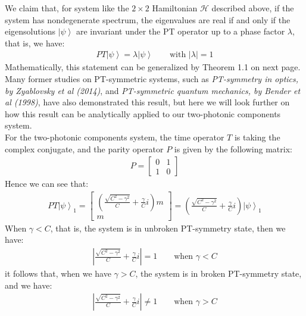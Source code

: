 \documentclass[1pt]{book}
\theoremstyle{break}
\theoremstyle{break}
\newcommand{\bmat}[1]{\begin{bmatrix} #1 \end{bmatrix}}
\begin{document}
We claim that, for system like the $2\times 2$ Hamiltonian 
$\mathcal{H}$ described above, if the system has nondegenerate spectrum,  the eigenvalues are real if and only if the eigensolutions $ \left|\psi\right>$ are invariant under the PT operator up to a phase factor $\lambda$, that is, we have:
\begin{align*}
PT \left|\psi\right> = \lambda \left|\psi\right> \qquad \text{with }|\lambda | =1  \tag{in unbroken PT-symmetric phase}
\end{align*}
Mathematically, this statement can be generalized by Theorem 1.1 on next page. Many former studies on PT-symmetric systems, such as \textit{PT-symmetry in optics, by Zyablovsky et al (2014)}, and \textit{PT-symmetric quantum mechanics, by Bender et al (1998)}, have also demonstrated this result, but here we will look further on how this result can be analytically applied to our two-photonic components system.\\

For the two-photonic components system, the time operator $T$ is taking the complex conjugate, and the parity operator $P$ is given by the following matrix:
\begin{align*}
P = \bmat{0 & 1 \\ 1 & 0}
\end{align*}
Hence we can see that:
\begin{align*}
PT \left|\psi\right>_1 = \bmat{\left(\frac{\sqrt{C^2 - \gamma^2}}{C}+\frac{\gamma}{C}i\right)m \\ m} = \left(\frac{\sqrt{C^2 - \gamma^2}}{C}+\frac{\gamma}{C}i\right) \left|\psi\right>_1
\end{align*}
When $\gamma< C$, that is, the system is in unbroken PT-symmetry state, then we have:
\begin{align*}
\left| \frac{\sqrt{C^2 - \gamma^2}}{C}+\frac{\gamma}{C}i \right| = 1 \qquad \text{when }\gamma<C
\end{align*}
it follows that, when we have $\gamma > C$, the system is in broken PT-symmetry state, and we have:
\begin{align*}
\left| \frac{\sqrt{C^2 - \gamma^2}}{C}+\frac{\gamma}{C}i \right| \neq 1 \qquad \text{when }\gamma > C
\end{align*}
\end{document}
